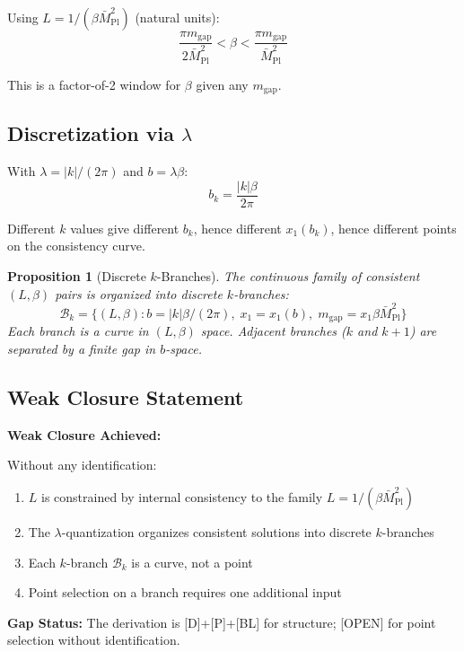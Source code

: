 \documentclass[11pt,a4paper]{article}
\newtheorem{proposition}[theorem]{Proposition}
\begin{document}
Using $L = 1/(\beta \bar{M}_{\text{Pl}}^2)$ (natural units):
\begin{equation}
  \frac{\pi m_{\text{gap}}}{2 \bar{M}_{\text{Pl}}^2} < \beta < \frac{\pi m_{\text{gap}}}{\bar{M}_{\text{Pl}}^2}
  \label{eq:beta-window}
\end{equation}

This is a factor-of-2 window for $\beta$ given any $m_{\text{gap}}$.

\subsection{Discretization via $\lambda$}

With $\lambda = |k|/(2\pi)$ and $b = \lambda \beta$:
\begin{equation}
  b_k = \frac{|k| \beta}{2\pi}
  \label{eq:bk-def}
\end{equation}

Different $k$ values give different $b_k$, hence different $x_1(b_k)$, hence
different points on the consistency curve.

\begin{proposition}[Discrete $k$-Branches]
\label{prop:k-branches}
The continuous family of consistent $(L, \beta)$ pairs is organized into
discrete $k$-branches:
\begin{equation}
  \mathcal{B}_k = \{ (L, \beta) : b = |k|\beta/(2\pi), \; x_1 = x_1(b), \;
                    m_{\text{gap}} = x_1 \beta \bar{M}_{\text{Pl}}^2 \}
  \label{eq:k-branch}
\end{equation}
Each branch is a curve in $(L, \beta)$ space. Adjacent branches ($k$ and $k+1$)
are separated by a finite gap in $b$-space.
\end{proposition}

\subsection{Weak Closure Statement}

\begin{closurebox}
\textbf{Weak Closure Achieved:}

Without any identification:
\begin{enumerate}
  \item $L$ is constrained by internal consistency to the family $L = 1/(\beta \bar{M}_{\text{Pl}}^2)$
  \item The $\lambda$-quantization organizes consistent solutions into discrete $k$-branches
  \item Each $k$-branch $\mathcal{B}_k$ is a curve, not a point
  \item Point selection on a branch requires one additional input
\end{enumerate}

\textbf{Gap Status:} The derivation is [D]+[P]+[BL] for structure; [OPEN] for
point selection without identification.
\end{closurebox}
\end{document}
